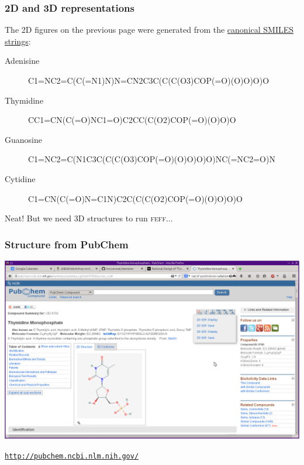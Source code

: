 \documentclass[10pt, xcolor=x11names, compress]{beamer}
\begin{document}
\begin{frame}
  \frametitle{2D and 3D representations}
  The 2D figures on the previous page were generated from the 
  \href{http://en.wikipedia.org/wiki/Simplified_molecular-input_line-entry_system}%
  {\color{Blue4}canonical SMILES strings}:

  \bigskip

  \begin{description}
  \item[Adenisine] {\tiny C1=NC2=C(C(=N1)N)N=CN2C3C(C(C(O3)COP(=O)(O)O)O)O}
  \item[Thymidine] {\tiny CC1=CN(C(=O)NC1=O)C2CC(C(O2)COP(=O)(O)O)O}
  \item[Guanosine] {\tiny C1=NC2=C(N1C3C(C(C(O3)COP(=O)(O)O)O)O)NC(=NC2=O)N}
  \item[Cytidine] {\tiny C1=CN(C(=O)N=C1N)C2C(C(C(O2)COP(=O)(O)O)O)O}
  \end{description}

  \bigskip

  \begin{alertblock}{}
    \centering Neat!  But we need 3D structures to run \textsc{feff}...
  \end{alertblock}
\end{frame}

\begin{frame}
  \frametitle{Structure from PubChem}
  \includegraphics[width=\linewidth]{images/Thymidine-PubChem.png}  

  \medskip

  \begin{flushright}
    \href{http://pubchem.ncbi.nlm.nih.gov/}%
    {\color{Blue4}\texttt{http://pubchem.ncbi.nlm.nih.gov/}}
  \end{flushright}
\end{frame}
\end{document}
